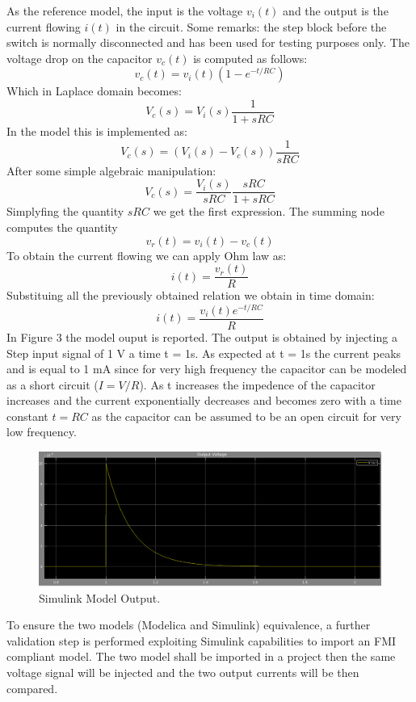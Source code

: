 As the reference model, the input is the voltage $v_i(t)$ and the output is the current flowing $i(t)$ in the circuit. 
\newline
Some remarks: the step block before the switch is normally disconnected and has been used for testing purposes only. 
\newline
The voltage drop on the capacitor $v_c(t)$ is computed as follows:
$$v_c(t) = v_i(t)(1 - e^{-t/RC})$$
Which in Laplace domain becomes:
$$V_c(s) = V_i(s)\frac{1}{1 + sRC}$$
In the model this is implemented as:
$$V_c(s) = (V_i(s)-V_c(s))\frac{1}{sRC}$$
After some simple algebraic manipulation:
$$V_c(s) = \frac{V_i(s)}{sRC}\frac{sRC}{1 + sRC}$$
Simplyfing the quantity $sRC$ we get the first expression.
\newline
The summing node computes the quantity $$v_r(t) = v_i(t) - v_c(t)$$
To obtain the current flowing we can apply Ohm law as: $$i(t) = 	\frac{v_r(t)}{R}$$
Substituing all the previously obtained relation we obtain in time domain:
$$i(t) = 	\frac{v_i(t)e^{-t/RC}}{R}$$
In Figure 3 the model ouput is reported. The output is obtained by injecting a Step input signal of 1 V a time t = 1s. As expected at t = 1s the current peaks and is equal to 1 mA since for very high frequency the capacitor can be modeled as a short circuit ($I = V/R$). 
\newline
As t increases the impedence of the capacitor increases and the current exponentially decreases and becomes zero with a time constant $t = RC$  as the capacitor can be assumed to be an open circuit for very low frequency.
\newline
\begin{figure}[ht]
\centering
\includegraphics[width=1.0\textwidth]{SimulinkModelOut.png}
\caption{\label{fig:EquivalentModelOutput}Simulink Model Output.}
\end{figure}
\newline
To ensure the two models (Modelica and Simulink) equivalence, a further validation step is performed exploiting Simulink capabilities to import an FMI compliant model. The two model shall be imported in a project then the same voltage signal will be injected and the two output currents will be then compared.
